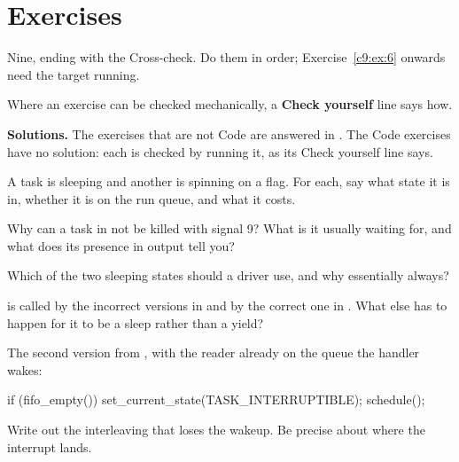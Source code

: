 
\section{Exercises}
\label{c9:sec:exercises}\label{c9:app:c}

\begin{aside}
Nine, ending with the Cross-check. Do them in order; Exercise~\ref{c9:ex:6} onwards need the target
running.

Where an exercise can be checked mechanically, a \textbf{Check yourself} line says how.

\textbf{Solutions.} The exercises that are not Code are answered in . The Code
exercises have no solution: each is checked by running it, as its Check yourself line says.
\end{aside}

\label{c9:ex:1}

 A task is sleeping and another is spinning on a flag. For each, say what state it is in,
whether it is on the run queue, and what it costs.

 Why can a task in  not be killed with signal 9? What is it
usually waiting for, and what does its presence in  output tell you?

 Which of the two sleeping states should a driver use, and why essentially always?

  is called by the incorrect versions in  and by the
correct one in . What else has to happen for it to be a sleep rather than a
yield?

\label{c9:ex:2}

The second version from , with the reader already on the queue the handler wakes:

\begin{ccode}
if (fifo_empty()) {
        set_current_state(TASK_INTERRUPTIBLE);
        schedule();
}
\end{ccode}

 Write out the interleaving that loses the wakeup. Be precise about where the interrupt
lands.

